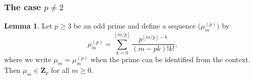 \documentclass[a4paper,11pt]{article}
\numberwithin{equation}{section}
\providecommand{\floor}[1]{\left\lfloor#1\right\rfloor}   %
\newcommand{\ZZ}{\mathbf{Z}} %
\theoremstyle{definition}
\newtheorem{lem}[thm]{Lemma}
\newtheorem{rem}[thm]{Remark}
\begin{document}
\begin{comment}
\begin{rem}
We observe that in equation~\eqref{eq:alpha2.0} the exponent 
$-\floor{(m+1)/4}+\nu_m$ is nonpositive for each value $m \geq 0$, 
which suggests the computational question of how to determine the 
sequence of factors 
\begin{equation*}
\Bigl(\frac{u_i+1}{d}\Bigr)_r 2^{- \floor{(m+1)/4} + \nu_m}
\end{equation*}
to $2$-adic precision $\tilde{N}$ without intermediate precision loss.
Changing our notation slightly, suppose we wish to compute the sequence
\begin{equation*}
f_r = 2^{- \floor{(m+1)/4} + \nu_m} \prod_{j=0}^{r-1} (u + j d)
\end{equation*}
for all $r \geq 0$, where $m(r) = m(0) + 2r$, $m(0) \in \{0,1\}$, 
$u$ is a positive integer and $d$ is a positive odd integer.
Explicitly, we find that this sequence satisfies 
\begin{align*}
f_0 & = 1, \\
f_1 & = u, \\
f_5 & = \begin{cases}
        \displaystyle \tfrac{1}{4} u (u + d) (u + 2d) (u + 3d) (u + 4d)
            & \text{if $m(0)=0$,} \\
        \displaystyle \tfrac{1}{8} u (u + d) (u + 2d) (u + 3d) (u + 4d)
            & \text{otherwise,}
        \end{cases} \\
f_r & = f_{r-2} \frac{(u + (r - 2)d)(u + (r - 1)d)}{2}
\end{align*}
for all remaining $r \geq 0$.  Since the product in the numerator is 
an even integer, it is clear that this computation can be carried 
out without precision loss despite reducing previous values of~$f_r$ 
modulo~$p^{\tilde{N}}$.
\end{rem}
\end{comment}

\subsubsection{The case $p \neq 2$}

\begin{lem} \label{lem:mup}
Let $p \geq 3$ be an odd prime and define a sequence 
$\bigl(\mu_m^{(p)}\bigr)$ by 
\begin{equation}
\mu_m^{(p)} = \sum_{k=0}^{\floor{m/p}} \frac{p^{\floor{m/p} - k}}{(m-pk)! k!}, 
\end{equation}
where we write $\mu_m = \mu_m^{(p)}$ when the prime can be identified 
from the context.  Then $\mu_m \in \ZZ_p$ for all $m \geq 0$.
\end{lem}
\end{document}
